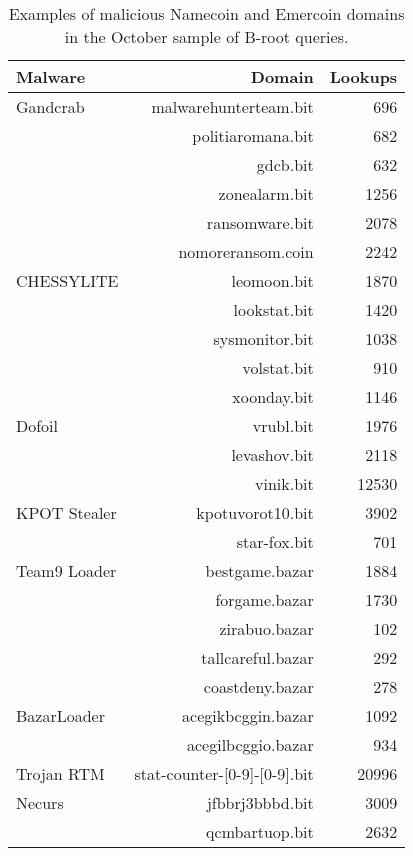 \begin{table}
	\begin{tabular}{lrr}
		\toprule
		Malware & Domain & Lookups \\
		\midrule
		Gandcrab	&	malwarehunterteam.bit	&	696	\\
		&	politiaromana.bit	&	682	\\
		&	gdcb.bit	&	632	\\
		&	zonealarm.bit	&	1256	\\
		&	ransomware.bit	&	2078	\\
		&	nomoreransom.coin	&	2242	\\
		CHESSYLITE	&	leomoon.bit	&	1870	\\
		&	lookstat.bit	&	1420	\\
		&	sysmonitor.bit	&	1038	\\
		&	volstat.bit	&	910	\\
		&	xoonday.bit	&	1146	\\
		Dofoil	&	vrubl.bit	&	1976	\\
		&	levashov.bit	&	2118	\\
		&	vinik.bit	&	12530	\\
		KPOT Stealer	&	kpotuvorot10.bit	&	3902	\\
		&	star-fox.bit	&	701	\\
		Team9 Loader	&	bestgame.bazar	&	1884	\\
		&	forgame.bazar	&	1730	\\
		&	zirabuo.bazar	&	102	\\
		&	tallcareful.bazar	&	292	\\
		&	coastdeny.bazar	&	278	\\
		BazarLoader	&	acegikbcggin.bazar	&	1092	\\
		&	acegilbcggio.bazar	&	934	\\
		Trojan RTM	&	stat-counter-[0-9]-[0-9].bit	&	20996	\\
		Necurs	&	jfbbrj3bbbd.bit	&	3009	\\
		& qcmbartuop.bit & 2632 \\
		\bottomrule
	\end{tabular}
	\caption{Examples of malicious Namecoin and Emercoin domains in the October 
	sample of B-root 
		queries.}
	\label{tab:namecoin_emercoin}
\end{table}

%	
%
%	

